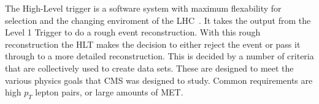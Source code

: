 The High-Level trigger is a software system with maximum flexability for selection and the changing enviroment of the LHC~\cite{Cittolin:578006}.  It takes the output from the Level 1 Trigger to do a rough event reconstruction.  With this rough reconstruction the HLT makes the decision to either reject the event or pass it through to a more detailed reconstruction.  This is decided by a number of criteria that are collectively used to create data sets.  These are designed to meet the various physics goals that CMS was designed to study. Common requirements are high $p_T$ lepton pairs, or large amounts of MET.%
